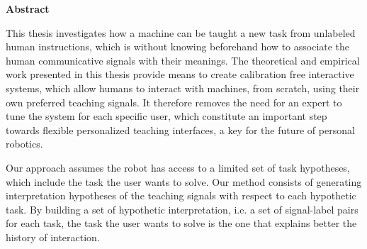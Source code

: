 
\begin{vcenterpage}
\begin{center}
{\LARGE\textbf{Abstract}} 
\end{center}


This thesis investigates how a machine can be taught a new task from unlabeled human instructions, which is without knowing beforehand how to associate the human communicative signals with their meanings. The theoretical and empirical work presented in this thesis provide means to create calibration free interactive systems, which allow humans to interact with machines, from scratch, using their own preferred teaching signals. It therefore removes the need for an expert to tune the system for each specific user, which constitute an important step towards flexible personalized teaching interfaces, a key for the future of personal robotics.

Our approach assumes the robot has access to a limited set of task hypotheses, which include the task the user wants to solve. Our method consists of generating interpretation hypotheses of the teaching signals with respect to each hypothetic task. By building a set of hypothetic interpretation, i.e. a set of signal-label pairs for each task, the task the user wants to solve is the one that explains better the history of interaction.



\end{vcenterpage}
